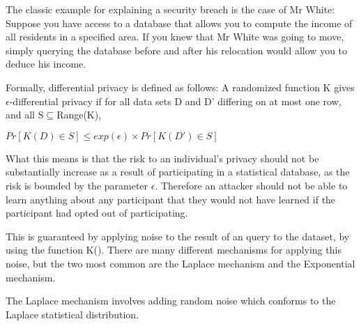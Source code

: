 The classic example for explaining a security breach is the case of Mr White: Suppose you have access to a database that allows you to compute the income of all residents in a specified area. If you knew that Mr White was going to move, simply querying the database before and after his relocation would allow you to deduce his income. 

Formally, differential privacy is defined as follows:
A randomized function K gives $\epsilon$-differential privacy if for all data sets D and D' differing on at most one row, and all S$\subseteq$Range(K),

 $Pr[K(D)\in S]\leq exp(\epsilon)\times Pr[K(D')\in S]$
 
What this means is that the risk to an individual's privacy should not be substantially increase as a result of participating in a statistical database, as the risk is bounded by the parameter $\epsilon$. Therefore an attacker should not be able to learn anything about any participant that they would not have learned if the participant had opted out of participating.

This is guaranteed by applying noise to the result of an query to the dataset, by using the function K(). There are many different mechanisms for applying this noise, but the two most common are the Laplace mechanism and the Exponential mechanism. 

The Laplace mechanism involves adding random noise which conforms to the Laplace statistical distribution. 

\cleardoublepage
